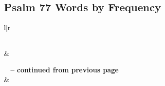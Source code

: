 

\subsection{Psalm 77 Words by Frequency}


\normalsize
 
\begin{center}
\begin{longtable}{l|r}
\caption[Psalm 77 Words by Frequency]{Psalm 77 Words by Frequency}\label{table:WordsbyFrequency for Psalm 77} \\
\hline {} &  \\ \hline 
\endfirsthead
 
{{\bfseries \tablename\ \thetable{} -- continued from previous page}} \\  
\hline {} &  \\ \hline 
\endhead
 

\end{longtable}
\end{center}
